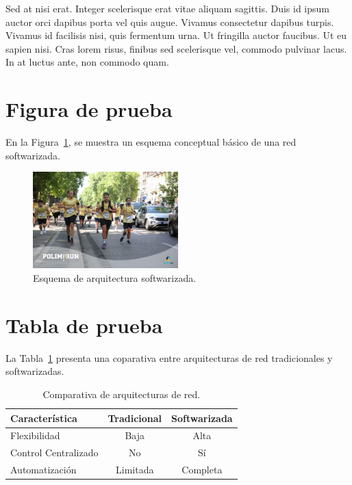 Sed at nisi erat. Integer scelerisque erat vitae aliquam sagittis. Duis id ipsum auctor orci dapibus porta vel quis augue. Vivamus consectetur dapibus turpis. Vivamus id facilisis nisi, quis fermentum urna. Ut fringilla auctor faucibus. Ut eu sapien nisi. Cras lorem risus, finibus sed scelerisque vel, commodo pulvinar lacus. In at luctus ante, non commodo quam.

\section{Figura de prueba}

En la Figura~\ref{fig:arquitectura}, se muestra un esquema conceptual básico de una red softwarizada.

\begin{figure}[ht]
    \centering
    \includegraphics[width=0.5\textwidth]{fig/test/test.jpg}
    \caption{Esquema de arquitectura softwarizada.}
    \label{fig:arquitectura}
\end{figure}

\section{Tabla de prueba}

La Tabla~\ref{tab:comparativa} presenta una coparativa entre arquitecturas de red tradicionales y softwarizadas.

\begin{table}[ht]
    \centering
    \begin{tabular}{|l|c|c|}
        \hline
        \textbf{Característica} & \textbf{Tradicional} & \textbf{Softwarizada} \\
        \hline
        Flexibilidad & Baja & Alta \\
        Control Centralizado & No & Sí \\
        Automatización & Limitada & Completa \\
        \hline
    \end{tabular}
    \caption{Comparativa de arquitecturas de red.}
    \label{tab:comparativa}
\end{table}

